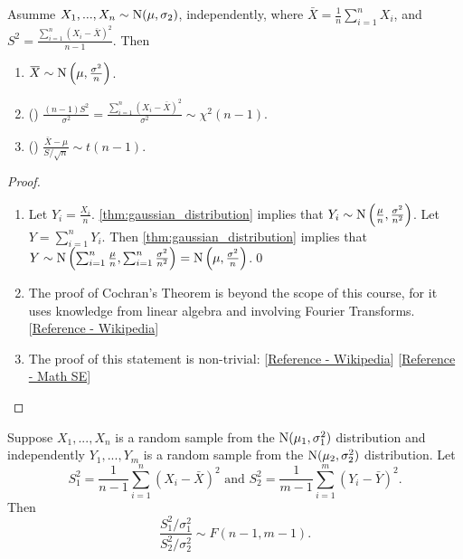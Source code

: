 \documentclass[notoc,notitlepage]{tufte-book}
\begin{document}
\begin{thm}
\label{thm:properties_of_the_gaussian_distribution}
  Asumme $X_1, ..., X_n \sim \operatorname{N}( \mu, \sigma_2 )$, independently, where $\bar{X} = \frac{1}{n} \sum_{i=1}^{n} X_i$, and $S^2 = \frac{\sum_{i=1}^{n} ( X_i - \bar{X} )^2}{n - 1}$. Then
  \begin{enumerate}
    \item $\bar{X} \sim \Nor\left( \mu, \frac{\sigma^2}{n} \right)$.
    \item () $\frac{( n - 1 ) S^2}{\sigma^2} = \frac{\sum_{i=1}^{n} (X_i - \bar{X})^2}{\sigma^2} \sim \chi^2 ( n - 1 )$.
    \item () $\frac{\bar{X} - \mu}{S / \sqrt{n}} \sim t(n - 1)$.
  \end{enumerate}
\end{thm}

\begin{proof}
  \begin{enumerate}
    \item Let $Y_i = \frac{X_i}{n}$. \cref{thm:gaussian_distribution} implies that $Y_i \sim \operatorname{N}\left( \frac{\mu}{n} , \frac{\sigma^2}{n^2} \right)$. Let $Y = \sum_{i=1}^{n} Y_i$. Then \cref{thm:gaussian_distribution} implies that $Y \sim \operatorname{N}\left( \sum_{i=1}^{n} \frac{\mu}{n}, \sum_{i=1}^{n} \frac{\sigma^2}{n^2} \right) = \operatorname{N}\left( \mu, \frac{\sigma^2}{n} \right)$.\qed
    \item The proof of Cochran's Theorem is beyond the scope of this course, for it uses knowledge from linear algebra and involving Fourier Transforms. [\href{https://en.wikipedia.org/wiki/Cochran\%27s_theorem}{Reference - Wikipedia}]
    \item The proof of this statement is non-trivial: [\href{https://en.wikipedia.org/wiki/Student\%27s\_t\-distribution}{Reference - Wikipedia}] [\href{https://math.stackexchange.com/questions/474733/derivation-of-the-density-function-of-student-t-distribution-from-this-big-integ}{Reference - Math SE}]
 \end{enumerate}
\end{proof}

\begin{thm}[F Distribution]
\label{thm:f_distribution}
Suppose $X_1, ..., X_n$ is a random sample from the $\operatorname{N}(\mu_1, \sigma_1^2)$ distribution and independently $Y_1, ..., Y_m$ is a random sample from the $\operatorname{N}(\mu_2, \sigma_2^2)$ distribution. Let
\begin{equation*}
  S_1^2 = \frac{1}{n - 1} \sum_{i=1}^{n} (X_i - \bar{X})^2 \text{ and } S_2^2 = \frac{1}{m - 1} \sum_{i=1}^{m} (Y_i - \bar{Y})^2.
\end{equation*}
Then
\begin{equation*}
  \frac{S_1^2 / \sigma_1^2}{S_2^2 / \sigma_2^2} \sim F( n - 1, m - 1 ).
\end{equation*}
\end{thm}
\end{document}
